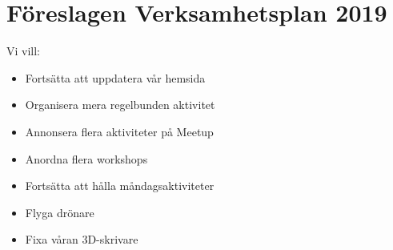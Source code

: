 \documentclass[a4paper,11pt,oneside]{article}
\begin{document}
\section*{Föreslagen Verksamhetsplan 2019}

Vi vill: \\
\begin{itemize}
\item Fortsätta att uppdatera vår hemsida
\item Organisera mera regelbunden aktivitet
\item Annonsera flera aktiviteter på Meetup
\item Anordna flera workshops
\item Fortsätta att hålla måndagsaktiviteter
\item Flyga drönare
\item Fixa våran 3D-skrivare
\end{itemize}
\end{document}
